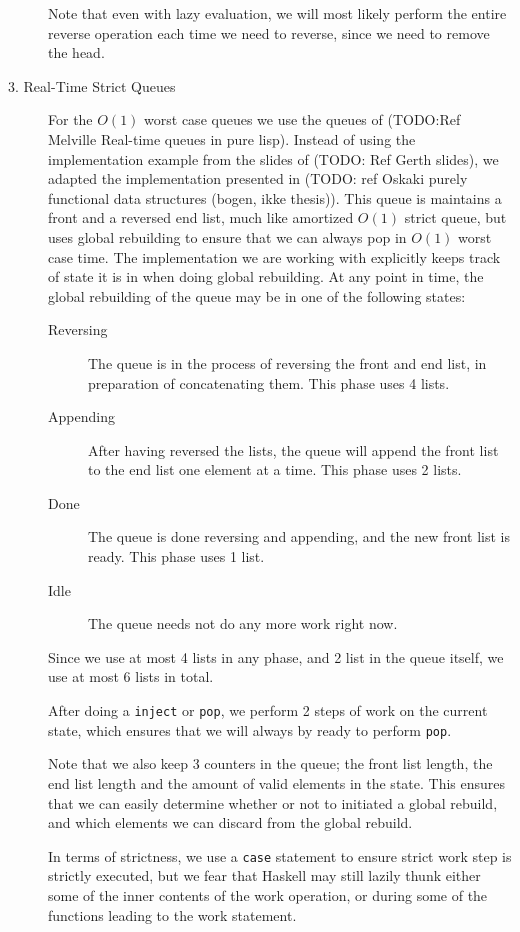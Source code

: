 \begin{description}
Note that even with lazy evaluation, we will most likely perform the entire reverse operation each time we need to reverse, since we need to remove the head.

\item[3. Real-Time Strict Queues] 
For the $O(1)$ worst case queues we use the queues of (TODO:Ref Melville Real-time queues in pure lisp). Instead of using the implementation example from the slides of (TODO: Ref Gerth slides), we adapted the implementation presented in (TODO: ref Oskaki purely functional data structures (bogen, ikke thesis)). This queue is maintains a front and a reversed end list, much like amortized $O(1)$ strict queue, but uses global rebuilding to ensure that we can always pop in $O(1)$ worst case time. The implementation we are working with explicitly keeps track of state it is in when doing global rebuilding. At any point in time, the global rebuilding of the queue may be in one of the following states:
\begin{description}
\item[Reversing] The queue is in the process of reversing the front and end list, in preparation of concatenating them. This phase uses 4 lists.
\item[Appending] After having reversed the lists, the queue will append the front list to the end list one element at a time. This phase uses 2 lists.
\item[Done] The queue is done reversing and appending, and the new front list is ready. This phase uses 1 list.
\item[Idle] The queue needs not do any more work right now.
\end{description}

Since we use at most 4 lists in any phase, and 2 list in the queue itself, we use at most 6 lists in total.

After doing a \texttt{inject} or \texttt{pop}, we perform 2 steps of work on the current state, which ensures that we will always by ready to perform \texttt{pop}.

Note that we also keep 3 counters in the queue; the front list length, the end list length and the amount of valid elements in the state. This ensures that we can easily determine whether or not to initiated a global rebuild, and which elements we can discard from the global rebuild.

In terms of strictness, we use a \texttt{case} statement to ensure strict work step is strictly executed, but we fear that Haskell may still lazily thunk either some of the inner contents of the work operation, or during some of the functions leading to the work statement.


\end{description}
